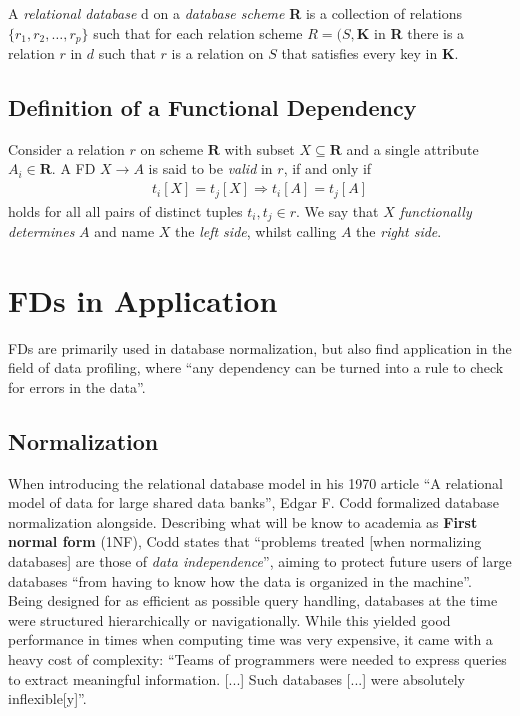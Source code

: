 A \emph{relational database} d on a \emph{database scheme} \textbf{R} is a collection of relations \(\{r_1, r_2, \dots, r_p \}\) such that for each relation scheme \(R = (S, \boldsymbol{K}\) in \textbf{R} there is a relation \(r\) in \(d\) such that \(r\) is a relation on \(S\) that satisfies every key in \(\boldsymbol{K}\). \cite[p.~94]{MAI83}

\subsection{Definition of a Functional Dependency}
Consider a relation \(r\) on scheme \(\boldsymbol{R}\) with subset \(X \subseteq \boldsymbol{R}\) and a single attribute \(A_i \in \boldsymbol{R}\).
A FD \(X \to A\) is said to be \emph{valid} in \(r\), if and only if
\begin{align}
    t_i[X] = t_j[X] \Rightarrow t_i[A] = t_j[A] \label{eq:fd-condition}
\end{align}
holds for all all pairs of distinct tuples \(t_i,t_j \in r\).\cite[p.~21]{ABE19}
We say that \(X\) \emph{functionally determines} \(A\)\cite[p.~43]{MAI83} and name \(X\) the \emph{left side}, whilst calling \(A\) the \emph{right side}.


\section{FDs in Application}
FDs are primarily used in database normalization,\cite[p.~1]{CAR16} but also find application in the field of data profiling, where ``any dependency can be turned into a rule to check for errors in the data''.\cite[p.~9]{ABE19}

\subsection{Normalization}
When introducing the relational database model in his 1970 article ``A relational model of data for large shared data banks'', Edgar F. Codd formalized database normalization alongside.\cite{COD70}
Describing what will be know to academia as \textbf{First normal form} (1NF), Codd states that ``problems treated [when normalizing databases] are those of \emph{data independence}'', aiming to protect future users of large databases ``from having to know how the data is organized in the machine''. \cite[p.~1]{COD70} \\

Being designed for as efficient as possible query handling, databases at the time were structured hierarchically or navigationally.
While this yielded good performance in times when computing time was very expensive, it came with a heavy cost of complexity:
``Teams of programmers were needed to express queries to extract meaningful information. [...] Such databases [...] were absolutely inflexible[y]''.\cite{IBM03}

